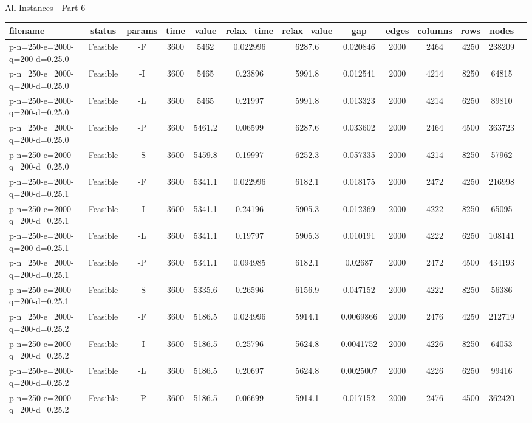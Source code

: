 \documentclass[landscape, a4paper]{article}
\begin{document}
\begin{center}
All Instances - Part 6

\begin{tabular}{lcccccccccccc}
filename & status & params & time & value & relax\_time & relax\_value & gap & edges & columns & rows & nodes & \\
\hline
p-n=250-e=2000-q=200-d=0.25.0 & Feasible & -F & 3600 & 5462 & 0.022996 & 6287.6 & 0.020846 & 2000 & 2464 & 4250 & 238209 & \\
p-n=250-e=2000-q=200-d=0.25.0 & Feasible & -I & 3600 & 5465 & 0.23896 & 5991.8 & 0.012541 & 2000 & 4214 & 8250 & 64815 & \\
p-n=250-e=2000-q=200-d=0.25.0 & Feasible & -L & 3600 & 5465 & 0.21997 & 5991.8 & 0.013323 & 2000 & 4214 & 6250 & 89810 & \\
p-n=250-e=2000-q=200-d=0.25.0 & Feasible & -P & 3600 & 5461.2 & 0.06599 & 6287.6 & 0.033602 & 2000 & 2464 & 4500 & 363723 & \\
p-n=250-e=2000-q=200-d=0.25.0 & Feasible & -S & 3600 & 5459.8 & 0.19997 & 6252.3 & 0.057335 & 2000 & 4214 & 8250 & 57962 & \\
p-n=250-e=2000-q=200-d=0.25.1 & Feasible & -F & 3600 & 5341.1 & 0.022996 & 6182.1 & 0.018175 & 2000 & 2472 & 4250 & 216998 & \\
p-n=250-e=2000-q=200-d=0.25.1 & Feasible & -I & 3600 & 5341.1 & 0.24196 & 5905.3 & 0.012369 & 2000 & 4222 & 8250 & 65095 & \\
p-n=250-e=2000-q=200-d=0.25.1 & Feasible & -L & 3600 & 5341.1 & 0.19797 & 5905.3 & 0.010191 & 2000 & 4222 & 6250 & 108141 & \\
p-n=250-e=2000-q=200-d=0.25.1 & Feasible & -P & 3600 & 5341.1 & 0.094985 & 6182.1 & 0.02687 & 2000 & 2472 & 4500 & 434193 & \\
p-n=250-e=2000-q=200-d=0.25.1 & Feasible & -S & 3600 & 5335.6 & 0.26596 & 6156.9 & 0.047152 & 2000 & 4222 & 8250 & 56386 & \\
p-n=250-e=2000-q=200-d=0.25.2 & Feasible & -F & 3600 & 5186.5 & 0.024996 & 5914.1 & 0.0069866 & 2000 & 2476 & 4250 & 212719 & \\
p-n=250-e=2000-q=200-d=0.25.2 & Feasible & -I & 3600 & 5186.5 & 0.25796 & 5624.8 & 0.0041752 & 2000 & 4226 & 8250 & 64053 & \\
p-n=250-e=2000-q=200-d=0.25.2 & Feasible & -L & 3600 & 5186.5 & 0.20697 & 5624.8 & 0.0025007 & 2000 & 4226 & 6250 & 99416 & \\
p-n=250-e=2000-q=200-d=0.25.2 & Feasible & -P & 3600 & 5186.5 & 0.06699 & 5914.1 & 0.017152 & 2000 & 2476 & 4500 & 362420 & \\

\end{tabular}
\end{center}
\end{document}
